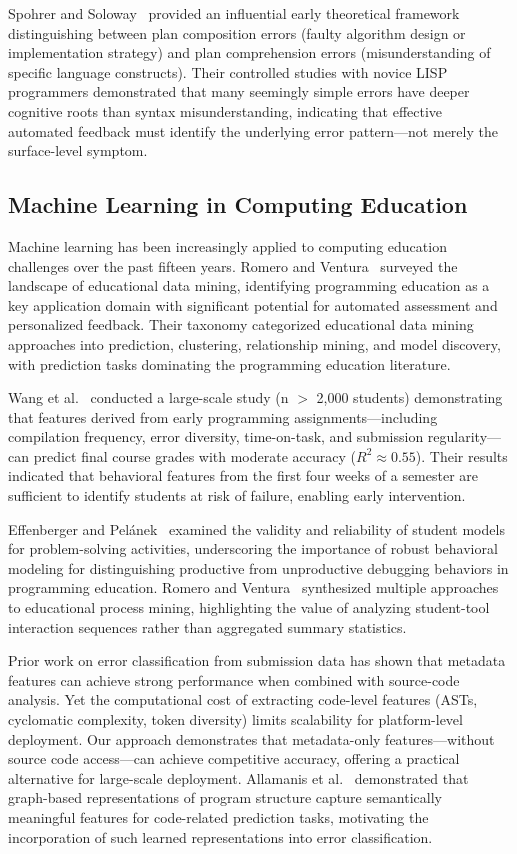 \documentclass[acmsmall]{acmart}
\begin{document}
Spohrer and Soloway~\cite{spohrer1986novice} provided an influential early
theoretical framework distinguishing between plan composition errors (faulty
algorithm design or implementation strategy) and plan comprehension errors
(misunderstanding of specific language constructs). Their controlled studies
with novice LISP programmers demonstrated that many seemingly simple errors
have deeper cognitive roots than syntax misunderstanding, indicating that
effective automated feedback must identify the underlying error pattern---not
merely the surface-level symptom.

\subsection{Machine Learning in Computing Education}

Machine learning has been increasingly applied to computing education
challenges over the past fifteen years. Romero and
Ventura~\cite{romero2013data}
surveyed the landscape of educational data mining, identifying programming
education as a key application domain with significant potential for automated
assessment and personalized feedback. Their taxonomy categorized educational
data mining approaches into prediction, clustering, relationship mining, and
model discovery, with prediction tasks dominating the programming education
literature.

Wang et al.~\cite{wang2017learning} conducted a large-scale study (n $>$ 2,000
students) demonstrating that features derived from early programming
assignments---including compilation frequency, error diversity, time-on-task,
and submission regularity---can predict final course grades with moderate
accuracy ($R^2 \approx 0.55$). Their results indicated that behavioral
features from the first four weeks of a semester are sufficient to identify
students at risk of failure, enabling early intervention.

Effenberger and Pel\'anek~\cite{effenberger2021validity} examined the
validity and reliability of student models for problem-solving activities,
underscoring the importance of robust behavioral modeling for distinguishing
productive from unproductive debugging behaviors in programming education. Romero and Ventura~\cite{romero2013data}
synthesized multiple approaches to educational process mining, highlighting the
value of analyzing student-tool interaction sequences rather than aggregated
summary statistics.

Prior work on error classification from submission data has shown that
metadata features can achieve strong performance when combined with
source-code analysis. Yet the computational cost of extracting
code-level features (ASTs, cyclomatic complexity, token diversity)
limits scalability for platform-level deployment. Our approach demonstrates
that metadata-only features---without source code access---can achieve
competitive accuracy, offering a practical alternative for large-scale
deployment. Allamanis et al.~\cite{allamanis2018learning} demonstrated that
graph-based representations of program structure capture semantically
meaningful features for code-related prediction tasks, motivating the
incorporation of such learned representations into error classification.
\end{document}
